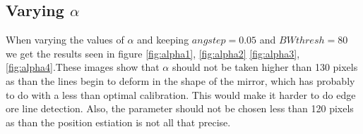 \documentclass[a4paper, 20pt]{report}
\begin{document}
\subsection{Varying $\alpha$}

When varying the values of $\alpha$ and keeping $angstep = 0.05$ and $BWthresh=
80$ we get the results seen in figure \ref{fig:alpha1}, \ref{fig:alpha2}
\ref{fig:alpha3}, \ref{fig:alpha4}.These images show that $\alpha$ should not be
taken higher than 130 pixels as than the lines begin to deform in the shape of
the mirror, which has probably to do with a less than optimal calibration. This
would make it harder to do edge ore line detection. Also,
the parameter should not be chosen less than 120 pixels as than the position
estiation is not all that precise.

\begin{figure}[!ht]
\centering
\begin{floatrow}
  
  \label{fig:alpha2}}{
  \texttt{[image: fig9.png]}}
\end{floatrow}
\end{figure}

\begin{figure}[!ht]
\centering
\begin{floatrow}
  
  \label{fig:alpha4}}{
  \texttt{[image: fig12.png]}}
\end{floatrow}
\end{figure}
\end{document}
